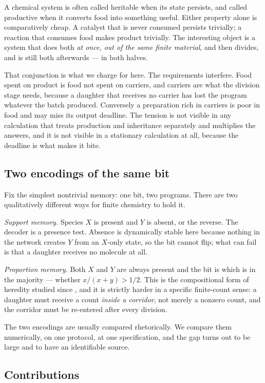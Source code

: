 \documentclass[11pt]{article}
\theoremstyle{plain}
\theoremstyle{definition}
\theoremstyle{remark}
\begin{document}
A chemical system is often called heritable when its state persists, and
called productive when it converts food into something useful. Either property
alone is comparatively cheap. A catalyst that is never consumed persists
trivially; a reaction that consumes food makes product trivially. The
interesting object is a system that does both \emph{at once, out of the same
finite material}, and then divides, and is still both afterwards --- in both
halves.

That conjunction is what we charge for here. The requirements interfere. Food
spent on product is food not spent on carriers, and carriers are what the
division stage needs, because a daughter that receives no carrier has lost the
program whatever the batch produced. Conversely a preparation rich in carriers
is poor in food and may miss its output deadline. The tension is not visible
in any calculation that treats production and inheritance separately and
multiplies the answers, and it is not visible in a stationary calculation at
all, because the deadline is what makes it bite.

\subsection{Two encodings of the same bit}

Fix the simplest nontrivial memory: one bit, two programs. There are two
qualitatively different ways for finite chemistry to hold it.

\emph{Support memory.} Species $X$ is present and $Y$ is absent, or the
reverse. The decoder is a presence test. Absence is dynamically stable here
because nothing in the network creates $Y$ from an $X$-only state, so the bit
cannot flip; what can fail is that a daughter receives no molecule at all.

\emph{Proportion memory.} Both $X$ and $Y$ are always present and the bit is
which is in the majority --- whether $x/(x+y)>1/2$. This is the compositional
form of heredity studied since \cite{segre2000}, and it is strictly harder in
a specific finite-count sense: a daughter must receive a count \emph{inside a
corridor}, not merely a nonzero count, and the corridor must be re-entered
after every division.

The two encodings are usually compared rhetorically. We compare them
numerically, on one protocol, at one specification, and the gap turns out to
be large and to have an identifiable source.

\subsection{Contributions}
\end{document}
